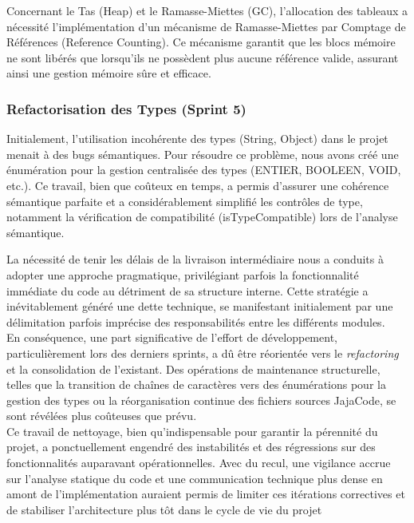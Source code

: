 Concernant le Tas (Heap) et le Ramasse-Miettes (GC), l'allocation des tableaux a nécessité l'implémentation d'un mécanisme de Ramasse-Miettes par Comptage de Références (Reference Counting). Ce mécanisme garantit que les blocs mémoire ne sont libérés que lorsqu'ils ne possèdent plus aucune référence valide, assurant ainsi une gestion mémoire sûre et efficace.

\subsubsection{Refactorisation des Types (Sprint 5)}

Initialement, l'utilisation incohérente des types (String, Object) dans le projet menait à des bugs sémantiques. Pour résoudre ce problème, nous avons créé une énumération pour la gestion centralisée des types (ENTIER, BOOLEEN, VOID, etc.). Ce travail, bien que coûteux en temps, a permis d'assurer une cohérence sémantique parfaite et a considérablement simplifié les contrôles de type, notamment la vérification de compatibilité (isTypeCompatible) lors de l'analyse sémantique.


La nécessité de tenir les délais de la livraison intermédiaire nous a conduits à adopter une approche pragmatique, privilégiant parfois la fonctionnalité immédiate du code au détriment de sa structure interne. Cette stratégie a inévitablement généré une dette technique, se manifestant initialement par une délimitation parfois imprécise des responsabilités entre les différents modules.\\

En conséquence, une part significative de l'effort de développement, particulièrement lors des derniers sprints, a dû être réorientée vers le \textit{refactoring} et la consolidation de l'existant. Des opérations de maintenance structurelle, telles que la transition de chaînes de caractères vers des énumérations pour la gestion des types ou la réorganisation continue des fichiers sources JajaCode, se sont révélées plus coûteuses que prévu.\\

Ce travail de nettoyage, bien qu'indispensable pour garantir la pérennité du projet, a ponctuellement engendré des instabilités et des régressions sur des fonctionnalités auparavant opérationnelles. Avec du recul, une vigilance accrue sur l'analyse statique du code et une communication technique plus dense en amont de l'implémentation auraient permis de limiter ces itérations correctives et de stabiliser l'architecture plus tôt dans le cycle de vie du projet


